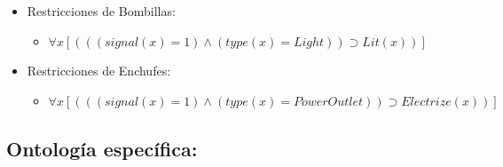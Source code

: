 \documentclass[10pt, a4paper,spanish]{article}
\begin{document}
\begin{itemize}
				\item Restricciones de Bombillas:
				\begin{itemize}
					\item$ \forall x [(((signal(x) = 1) \land (type(x) = Light) )  \supset Lit(x))] $
				\end{itemize}

				\item Restricciones de Enchufes:
				\begin{itemize}
					\item$ \forall x [(((signal(x) = 1) \land (type(x) = PowerOutlet) )  \supset Electrize(x))] $
				\end{itemize}
			\end{itemize}

		\subsection{Ontología específica:}
\end{document}
